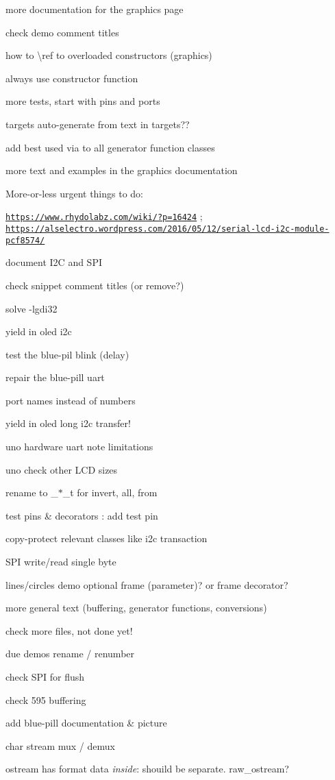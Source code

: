 \begin{DoxyItemize}
\item more documentation for the graphics page
\item check demo comment titles
\item how to \textbackslash{}ref to overloaded constructors (graphics)
\item always use constructor function
\item more tests, start with pins and ports
\item targets auto-\/generate from text in targets??
\item add \textquotesingle{}best used via\textquotesingle{} to all generator function classes
\item more text and examples in the graphics documentation
\end{DoxyItemize}

More-\/or-\/less urgent things to do\+:
\begin{DoxyItemize}
\item \href{https://www.rhydolabz.com/wiki/?p=16424}{\tt https\+://www.\+rhydolabz.\+com/wiki/?p=16424} ; \href{https://alselectro.wordpress.com/2016/05/12/serial-lcd-i2c-module-pcf8574/}{\tt https\+://alselectro.\+wordpress.\+com/2016/05/12/serial-\/lcd-\/i2c-\/module-\/pcf8574/}
\item document I2C and S\+PI
\item check snippet comment titles (or remove?)
\item solve -\/lgdi32
\item yield in oled i2c
\item test the blue-\/pil blink (delay)
\item repair the blue-\/pill uart
\item port names instead of numbers
\item yield in oled long i2c transfer!
\item uno hardware uart note limitations
\item uno check other L\+CD sizes
\item rename to \+\_\+$\ast$\+\_\+t for invert, all, from
\item test pins \& decorators \+: add test pin
\item copy-\/protect relevant classes like i2c transaction
\item S\+PI write/read single byte
\item lines/circles demo optional frame (parameter)? or frame decorator?
\item more general text (buffering, generator functions, conversions)
\item check more files, not done yet!
\item due demos\textquotesingle{} rename / renumber
\item check S\+PI for flush
\item check 595 buffering
\item add blue-\/pill documentation \& picture
\item char stream mux / demux
\item ostream has format data {\itshape inside}\+: shouild be separate. raw\+\_\+ostream? 
\end{DoxyItemize}
